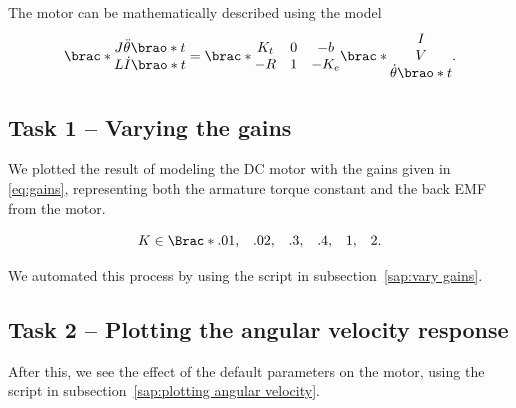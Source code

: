 \documentclass[12pt]{article}
\DeclarePairedDelimiter\brao()%
\DeclarePairedDelimiter\brac[]%
\DeclarePairedDelimiter\Brac\{\}%
\begin{document}
The motor can be mathematically described using the model
\begin{equation}
    \brac*{
        \begin{matrix}
            J\ddot\theta\brao*t \\* L\dot{I}\brao*t
        \end{matrix}
    } =
    \brac*{
        \begin{matrix}
            K_t & 0 & -b \\*
            -R & 1 & -K_e \\*
        \end{matrix}
    }\brac*{
        \begin{matrix}
            I \\* V \\* \dot\theta\brao*t
        \end{matrix}
    }.
\end{equation}





\subsection{Task 1 -- Varying the gains}

We plotted the result of modeling the DC motor with the gains given in \eqref{eq:gains}, representing both the armature torque constant and the back EMF from the motor.

\begin{equation}\label{eq:gains}
    K \in \Brac*{\begin{matrix}.01, & .02, & .3, & .4, & 1, & 2\end{matrix}}.
\end{equation}

We automated this process by using the script in  subsection~\ref{sap:vary gains}.

\subsection{Task 2 -- Plotting the angular velocity response}

After this, we see the effect of the default parameters on the motor, using the script in  subsection~\ref{sap:plotting angular velocity}.
\end{document}
